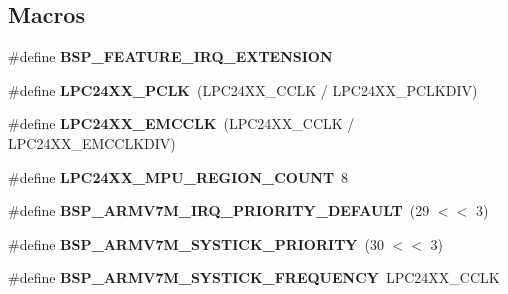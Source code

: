 \subsection*{Macros}
\begin{DoxyCompactItemize}
\item 
\mbox{\label{group__RTEMSBSPsARMLPC24XX_ga5d7d631d3a14b7554160f14eb42f351b}} 
\#define {\bfseries B\+S\+P\+\_\+\+F\+E\+A\+T\+U\+R\+E\+\_\+\+I\+R\+Q\+\_\+\+E\+X\+T\+E\+N\+S\+I\+ON}
\item 
\mbox{\label{group__RTEMSBSPsARMLPC24XX_ga082ecb24326d15777770ed1115b1b89f}} 
\#define {\bfseries L\+P\+C24\+X\+X\+\_\+\+P\+C\+LK}~(L\+P\+C24\+X\+X\+\_\+\+C\+C\+LK / L\+P\+C24\+X\+X\+\_\+\+P\+C\+L\+K\+D\+IV)
\item 
\mbox{\label{group__RTEMSBSPsARMLPC24XX_gab28478f7d242ac471e5c267ddf1bb13a}} 
\#define {\bfseries L\+P\+C24\+X\+X\+\_\+\+E\+M\+C\+C\+LK}~(L\+P\+C24\+X\+X\+\_\+\+C\+C\+LK / L\+P\+C24\+X\+X\+\_\+\+E\+M\+C\+C\+L\+K\+D\+IV)
\item 
\mbox{\label{group__RTEMSBSPsARMLPC24XX_ga7ef2da458c225154fb74aef840ed8594}} 
\#define {\bfseries L\+P\+C24\+X\+X\+\_\+\+M\+P\+U\+\_\+\+R\+E\+G\+I\+O\+N\+\_\+\+C\+O\+U\+NT}~8
\item 
\mbox{\label{group__RTEMSBSPsARMLPC24XX_ga8cbce037173a026946db0e4628939104}} 
\#define {\bfseries B\+S\+P\+\_\+\+A\+R\+M\+V7\+M\+\_\+\+I\+R\+Q\+\_\+\+P\+R\+I\+O\+R\+I\+T\+Y\+\_\+\+D\+E\+F\+A\+U\+LT}~(29 $<$$<$ 3)
\item 
\mbox{\label{group__RTEMSBSPsARMLPC24XX_gaabc09d01f675047eb59c49fc7282017d}} 
\#define {\bfseries B\+S\+P\+\_\+\+A\+R\+M\+V7\+M\+\_\+\+S\+Y\+S\+T\+I\+C\+K\+\_\+\+P\+R\+I\+O\+R\+I\+TY}~(30 $<$$<$ 3)
\item 
\mbox{\label{group__RTEMSBSPsARMLPC24XX_ga484f5ed3be718d51567e87bcbca4783f}} 
\#define {\bfseries B\+S\+P\+\_\+\+A\+R\+M\+V7\+M\+\_\+\+S\+Y\+S\+T\+I\+C\+K\+\_\+\+F\+R\+E\+Q\+U\+E\+N\+CY}~L\+P\+C24\+X\+X\+\_\+\+C\+C\+LK
\item 
\mbox{\label{group__RTEMSBSPsARMLPC24XX_gadde0d66aef9442971dde465292ac14e6}} 

\end{DoxyCompactItemize}
